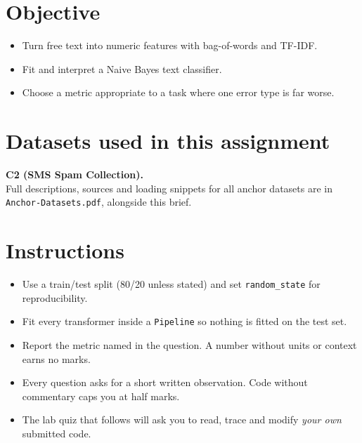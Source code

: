 \documentclass[11pt,a4paper]{article}
\begin{document}

\section*{Objective}

\begin{itemize}[leftmargin=*]

  \item Turn free text into numeric features with bag-of-words and TF-IDF.

  \item Fit and interpret a Naive Bayes text classifier.

  \item Choose a metric appropriate to a task where one error type is far worse.

\end{itemize}

\section*{Datasets used in this assignment}

\textbf{C2 (SMS Spam Collection).}\\ Full descriptions, sources and loading snippets for all anchor datasets are in \texttt{Anchor-Datasets.pdf}, alongside this brief.

\section*{Instructions}

\begin{itemize}[leftmargin=*]

  \item Use a train/test split (80/20 unless stated) and set \texttt{random\_state} for reproducibility.

  \item Fit every transformer inside a \texttt{Pipeline} so nothing is fitted on the test set.

  \item Report the metric named in the question. A number without units or context earns no marks.

  \item Every question asks for a short written observation. Code without commentary caps you at half marks.

  \item The lab quiz that follows will ask you to read, trace and modify \emph{your own} submitted code.

\end{itemize}
\end{document}
